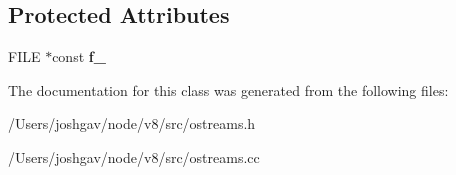 \subsection*{Protected Attributes}
\begin{DoxyCompactItemize}
\item 
F\+I\+LE $\ast$const {\bfseries f\+\_\+}\hypertarget{classv8_1_1internal_1_1_o_f_stream_base_a8f78fa74ae8177fe0586a7f36aafde64}{}\label{classv8_1_1internal_1_1_o_f_stream_base_a8f78fa74ae8177fe0586a7f36aafde64}

\end{DoxyCompactItemize}


The documentation for this class was generated from the following files\+:\begin{DoxyCompactItemize}
\item 
/\+Users/joshgav/node/v8/src/ostreams.\+h\item 
/\+Users/joshgav/node/v8/src/ostreams.\+cc\end{DoxyCompactItemize}
